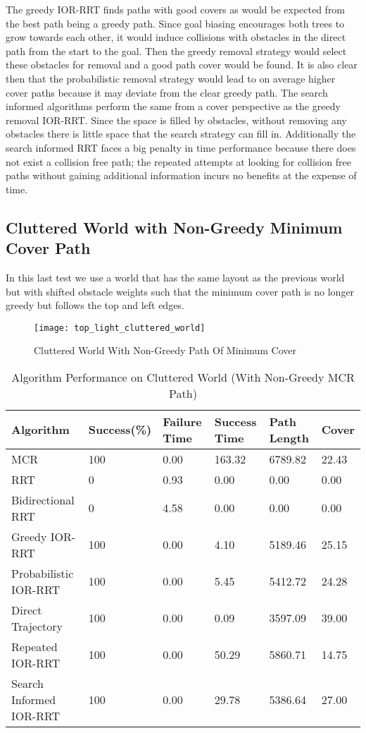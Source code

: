 The greedy IOR-RRT finds paths with good covers as would be expected from the best path being a greedy path. Since goal biasing encourages both trees to grow towards each other, it would induce collisions with obstacles in the direct path from the start to the goal. Then the greedy removal strategy would select these obstacles for removal and a good path cover would be found. It is also clear then that the probabilistic removal strategy would lead to on average higher cover paths because it may deviate from the clear greedy path. The search informed algorithms perform the same from a cover perspective as the greedy removal IOR-RRT. Since the space is filled by obstacles, without removing any obstacles there is little space that the search strategy can fill in. Additionally the search informed RRT faces a big penalty in time performance because there does not exist a collision free path; the repeated attempts at looking for collision free paths without gaining additional information incurs no benefits at the expense of time.


\subsection{Cluttered World with Non-Greedy Minimum Cover Path}
In this last test we use a world that has the same layout as the previous world but with shifted obstacle weights such that the minimum cover path is no longer greedy but follows the top and left edges. 

\begin{figure}[h!]
    \centering
    \texttt{[image: top\_light\_cluttered\_world]}
    \caption{Cluttered World With Non-Greedy Path Of Minimum Cover}
    \label{fig:top_light_cluttered_world}
\end{figure}

\begin{table}[h!]
\centering
\begin{tabular}{@{}llllll@{}}
\toprule
Algorithm & Success(\%)  & Failure Time  & Success Time  & Path Length & Cover\\ 
\midrule
MCR & 100 & 0.00 & 163.32 & 6789.82 & 22.43 \\
RRT & 0 & 0.93 & 0.00 & 0.00 & 0.00 \\
Bidirectional RRT & 0 & 4.58 & 0.00 & 0.00 & 0.00 \\
Greedy IOR-RRT & 100 & 0.00 & 4.10 & 5189.46 & 25.15 \\
Probabilistic IOR-RRT & 100 & 0.00 & 5.45 & 5412.72 & 24.28 \\
Direct Trajectory & 100 & 0.00 & 0.09 & 3597.09 & 39.00 \\
Repeated IOR-RRT & 100 & 0.00 & 50.29 & 5860.71 & 14.75 \\
Search Informed IOR-RRT & 100 & 0.00 & 29.78 & 5386.64 & 27.00 \\
\bottomrule
\end{tabular}
\caption{Algorithm Performance on Cluttered World (With Non-Greedy MCR Path)}
\label{tab:top_light_cluttered_world}
\end{table}

